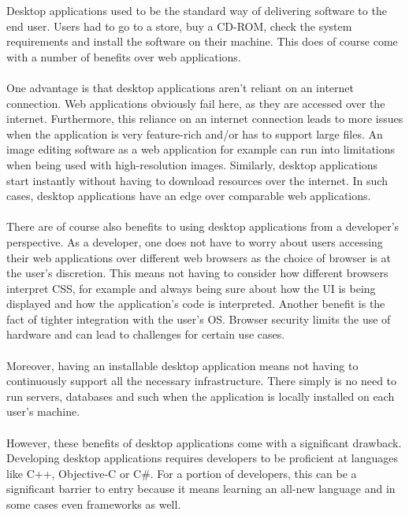 Desktop applications used to be the standard way of delivering software to the end user.
Users had to go to a store, buy a CD-ROM, check the system requirements and install the software 
on their machine.
This does of course come with a number of benefits over web applications.\paragraph{}
One advantage is that desktop applications aren't reliant on an internet connection.
Web applications obviously fail here, as they are accessed over the internet.
Furthermore, this reliance on an internet connection leads to more issues when the application
is very feature-rich and/or has to support large files.
An image editing software as a web application for example can run into limitations when being
used with high-resolution images. 
Similarly, desktop applications start instantly without having to download resources over the 
internet. 
In such cases, desktop applications have an edge over comparable web applications. \parencite{jensen2017}\paragraph{}
There are of course also benefits to using desktop applications from a developer's perspective.
As a developer, one does not have to worry about users accessing their web applications over different web browsers 
as the choice of browser is at the user's discretion. 
This means not having to consider how different browsers interpret CSS, for example and always being sure about how the UI 
is being displayed and how the application's code is interpreted.
Another benefit is the fact of tighter integration with the user's OS.
Browser security limits the use of hardware and can lead to challenges for certain use cases. \parencite{jensen2017}\paragraph{}
Moreover, having an installable desktop application means not having to continuously support all the necessary infrastructure.
There simply is no need to run servers, databases and such when the application is locally installed on each user's machine. \parencite{jensen2017}\paragraph{}
However, these benefits of desktop applications come with a significant drawback.
Developing desktop applications requires developers to be proficient at languages like C++, Objective-C or C\#. 
For a portion of developers, this can be a significant barrier to entry because it means learning an all-new language and in some cases even frameworks as well.

